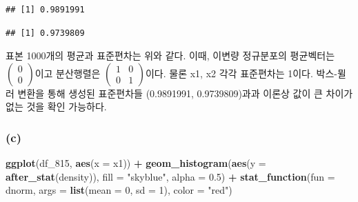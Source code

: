 \documentclass[
]{article}
\newenvironment{Shaded}{\begin{snugshade}}{\end{snugshade}}
\newcommand{\AttributeTok}[1]{\textcolor[rgb]{0.13,0.29,0.53}{#1}}
\newcommand{\DecValTok}[1]{\textcolor[rgb]{0.00,0.00,0.81}{#1}}
\newcommand{\FloatTok}[1]{\textcolor[rgb]{0.00,0.00,0.81}{#1}}
\newcommand{\FunctionTok}[1]{\textcolor[rgb]{0.13,0.29,0.53}{\textbf{#1}}}
\newcommand{\NormalTok}[1]{#1}
\newcommand{\SpecialCharTok}[1]{\textcolor[rgb]{0.81,0.36,0.00}{\textbf{#1}}}
\newcommand{\StringTok}[1]{\textcolor[rgb]{0.31,0.60,0.02}{#1}}
\begin{document}
\begin{Shaded}
\end{Shaded}

\begin{verbatim}
## [1] 0.9891991
\end{verbatim}

\begin{Shaded}
\end{Shaded}

\begin{verbatim}
## [1] 0.9739809
\end{verbatim}

표본 1000개의 평균과 표준편차는 위와 같다. 이때, 이변량 정규분포의
평균벡터는 \(\begin{pmatrix}0\\0\end{pmatrix}\)이고 분산행렬은
\(\begin{pmatrix}1&0\\0&1\end{pmatrix}\)이다. 물론 x1, x2 각각
표준편차는 1이다. 박스-뮐러 변환을 통해 생성된 표준편차들 (0.9891991,
0.9739809)과과 이론상 값이 큰 차이가 없는 것을 확인 가능하다.

\subsubsection{(c)}\label{c-4}

\begin{Shaded}
\begin{Highlighting}[]
\FunctionTok{ggplot}\NormalTok{(df\_815, }\FunctionTok{aes}\NormalTok{(}\AttributeTok{x =}\NormalTok{ x1)) }\SpecialCharTok{+}
  \FunctionTok{geom\_histogram}\NormalTok{(}\FunctionTok{aes}\NormalTok{(}\AttributeTok{y =} \FunctionTok{after\_stat}\NormalTok{(density)), }\AttributeTok{fill =} \StringTok{"skyblue"}\NormalTok{, }\AttributeTok{alpha =} \FloatTok{0.5}\NormalTok{) }\SpecialCharTok{+}
  \FunctionTok{stat\_function}\NormalTok{(}\AttributeTok{fun =}\NormalTok{ dnorm, }\AttributeTok{args =} \FunctionTok{list}\NormalTok{(}\AttributeTok{mean =} \DecValTok{0}\NormalTok{, }\AttributeTok{sd =} \DecValTok{1}\NormalTok{), }\AttributeTok{color =} \StringTok{"red"}\NormalTok{) }
\end{Highlighting}
\end{Shaded}
\end{document}
